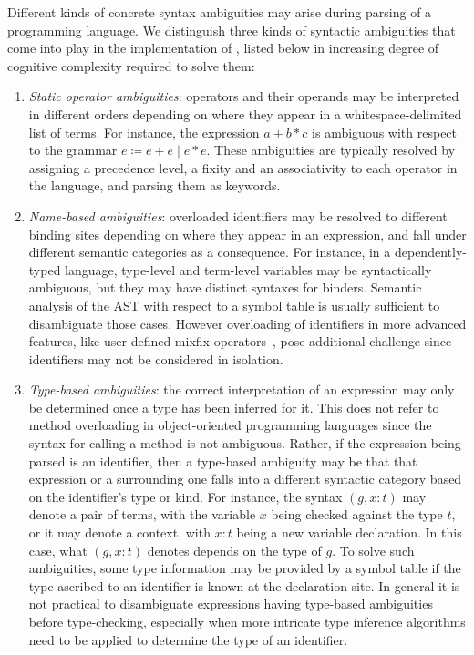 Different kinds of concrete syntax ambiguities may arise during parsing of a programming language.
We distinguish three kinds of syntactic ambiguities that come into play in the implementation of \Beluga, listed below in increasing degree of cognitive complexity required to solve them:
\begin{enumerate}
\item
\textit{Static operator ambiguities}: operators and their operands may be interpreted in different orders depending on where they appear in a whitespace-delimited list of terms.
For instance, the expression $a + b * c$ is ambiguous with respect to the grammar $e\coloneqq e+e\mid e*e$.
These ambiguities are typically resolved by assigning a precedence level, a fixity and an associativity to each operator in the language, and parsing them as keywords.
\item
\textit{Name-based ambiguities}: overloaded identifiers may be resolved to different binding sites depending on where they appear in an expression, and fall under different semantic categories as a consequence.
For instance, in a dependently-typed language, type-level and term-level variables may be syntactically ambiguous, but they may have distinct syntaxes for binders.
Semantic analysis of the \ac{AST} with respect to a symbol table is usually sufficient to disambiguate those cases.
However overloading of identifiers in more advanced features, like user-defined mixfix operators~\cite{danielsson2008parsing}, pose additional challenge since identifiers may not be considered in isolation.
\item
\textit{Type-based ambiguities}: the correct interpretation of an expression may only be determined once a type has been inferred for it.
This does not refer to method overloading in object-oriented programming languages since the syntax for calling a method is not ambiguous.
Rather, if the expression being parsed is an identifier, then a type-based ambiguity may be that that expression or a surrounding one falls into a different syntactic category based on the identifier's type or kind.
For instance, the syntax $ (g, x : t) $ may denote a pair of terms, with the variable $ x $ being checked against the type $ t $, or it may denote a context, with $ x : t $ being a new variable declaration.
In this case, what $ (g, x : t) $ denotes depends on the type of $ g $.
To solve such ambiguities, some type information may be provided by a symbol table if the type ascribed to an identifier is known at the declaration site.
In general it is not practical to disambiguate expressions having type-based ambiguities before type-checking, especially when more intricate type inference algorithms need to be applied to determine the type of an identifier.
\end{enumerate}

